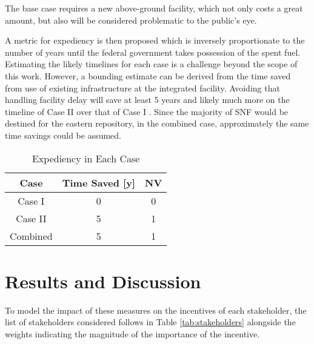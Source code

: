The base case requires a new above-ground facility, which not only costs a great
amount, but also will be considered problematic to the public's eye. 




A metric for expediency is then proposed which is inversely proportionate to 
the number of years until the federal government takes possession of the spent 
fuel. Estimating the likely timelines for each case is a challenge beyond the 
scope of this work. However, a bounding estimate can be derived from the time 
saved from use of existing infrastructure at the integrated facility. Avoiding 
that handling facility delay will save at least 5 years 
and likely much more on the timeline of Case II over that of Case I 
\cite{doe_strategy_2013}. Since the 
majority of \gls{SNF} would be destined for the eastern repository, in the combined case,
 approximately the same time savings could be assumed.

\begin{table}[h]
	\centering
        \caption {Expediency in Each Case}
		\begin{tabular}{|c|c|c|}
			\hline
                        Case & Time Saved [y] & NV \\
			\hline
			Case I & 0 & 0\\
			Case II & 5 & 1 \\
			Combined & 5 & 1\\ 
			\hline
                \end{tabular}
\end{table}

\section{Results and Discussion} 

To model the impact of these measures on the incentives of each stakeholder, 
the list of stakeholders considered follows in Table \ref{tab:stakeholders} 
alongside the weights indicating the magnitude of the importance of the incentive.
 
